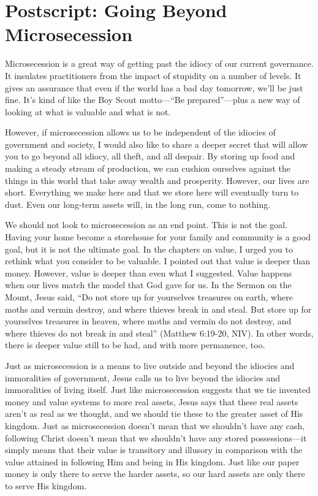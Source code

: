 \chapter*{Postscript: Going Beyond Microsecession}

Microsecession is a great way of getting past the idiocy of our current
governance. It insulates practitioners from the impact of stupidity on
a number of levels. It gives an assurance that even if the world has a
bad day tomorrow, we'll be just fine.
It's kind of like the Boy Scout motto---``Be
prepared''---plus a new way of looking at what is valuable and what is
not.

However, if microsecession allows us to be independent of the idiocies
of government and society, I would also like to share a deeper secret that
will allow you to go
beyond all idiocy, all theft, and all despair.  By storing up food and
making a steady stream of production, we can cushion ourselves against
the things in this world that take away wealth and prosperity. However, our lives are
short. Everything we make here and that we store here will eventually
turn to dust. Even our long-term assets will, in the long run, come to
nothing.

We should not look to microsecession as an end point. This is not the
goal. Having your home become a storehouse for your family and
community is a good goal, but it is not the ultimate goal. In the
chapters on value, I urged you to rethink what you consider to be valuable. I
pointed out that value is deeper than money. However, value is deeper
than even what I suggested. Value happens when our lives match the
model that God gave for us. In the Sermon on the Mount, Jesus said, ``Do
not store up for yourselves treasures on earth, where moths and vermin
destroy, and where thieves break in and steal. But store up for
yourselves treasures in heaven, where moths and vermin do not destroy,
and where thieves do not break in and steal'' (Matthew 6:19-20, NIV). In
other words, there is deeper value still to be had, and with more
permanence, too.

Just as microsecession is a means to live outside and beyond the
idiocies and immoralities of government, Jesus calls us to live beyond
the idiocies and immoralities of living itself. Just like
microsecession suggests that we tie invented money and value systems to more real
assets, Jesus says that these real assets aren't as
real as we thought, and we should tie these to the greater asset of His
kingdom. Just as microsecession doesn't mean that we
shouldn't have any cash, following Christ doesn't mean that we shouldn't have
any stored possessions---it simply means that their value is transitory
and illusory in comparison with the value attained in following
Him and being in His
kingdom. Just like our paper money is only there to serve the harder
assets, so our hard assets are only there to serve His kingdom.

